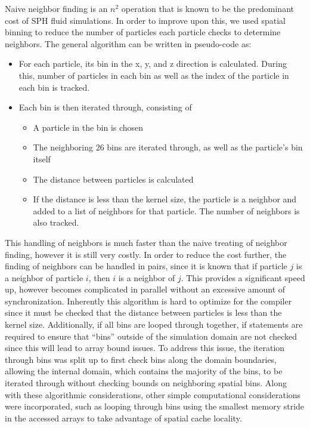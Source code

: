 \documentclass{scrartcl}
\begin{document}
  Naive neighbor finding is an $n^2$ operation that is known to be the predominant cost of SPH fluid simulations. In order to improve upon this, we used spatial binning to reduce the number of particles each particle checks to determine neighbors. The general algorithm can be written in pseudo-code as:
      \begin{itemize}
      	\item For each particle, its bin in the x, y, and z direction is calculated. During this, number of particles in each bin as well as the index of the particle in each bin is tracked.
      	\item Each bin is then iterated through, consisting of
	      	\begin{itemize}
	      		\item A particle in the bin is chosen
	      		\item The neighboring 26 bins are iterated through, as well as the particle's bin itself
	      		\item The distance between particles is calculated
	      		\item If the distance is less than the kernel size, the particle is a neighbor and added to a list of neighbors for that particle. The number of neighbors is also tracked.
	      	\end{itemize}
      \end{itemize}
   This handling of neighbors is much faster than the naive treating of neighbor finding, however it is still very costly. In order to reduce the cost further, the finding of neighbors can be handled in pairs, since it is known that if particle $j$ is a neighbor of particle $i$, then $i$ is a neighbor of $j$. This provides a significant speed up, however becomes complicated in parallel without an excessive amount of synchronization. Inherently this algorithm is hard to optimize for the compiler since it must be checked that the distance between particles is less than the kernel size. Additionally, if all bins are looped through together, if statements are required to ensure that ``bins'' outside of the simulation domain are not checked since this will lead to array bound issues. To address this issue, the iteration through bins was split up to first check bins along the domain boundaries, allowing the internal domain, which contains the majority of the bins, to be iterated through without checking bounds on neighboring spatial bins. Along with these algorithmic considerations, other simple computational considerations were incorporated, such as looping through bins using the smallest memory stride in the accessed arrays to take advantage of spatial cache locality.
   
\end{document}
